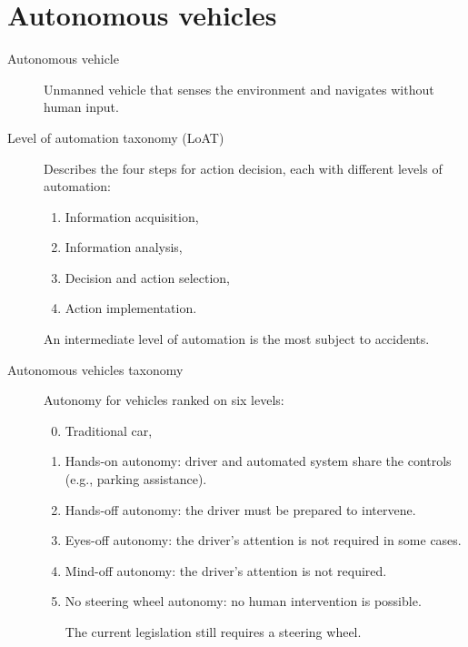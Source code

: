 \chapter{Autonomous vehicles}

\begin{description}
    \item[Autonomous vehicle] 
        Unmanned vehicle that senses the environment and navigates without human input.
\end{description}


\begin{description}
    \item[Level of automation taxonomy (LoAT)] 
        Describes the four steps for action decision, each with different levels of automation:
        \begin{enumerate}
            \item Information acquisition,
            \item Information analysis,
            \item Decision and action selection,
            \item Action implementation.
        \end{enumerate}

        \begin{remark}
            An intermediate level of automation is the most subject to accidents.
        \end{remark}
\end{description}


\begin{description}
    \item[Autonomous vehicles taxonomy] 
        Autonomy for vehicles ranked on six levels:
        \begin{enumerate}
            \setcounter{enumi}{-1}
            \item Traditional car,
            \item Hands-on autonomy: driver and automated system share the controls (e.g., parking assistance).
            \item Hands-off autonomy: the driver must be prepared to intervene.
            \item Eyes-off autonomy: the driver's attention is not required in some cases. 
            \item Mind-off autonomy: the driver's attention is not required. 
            \item No steering wheel autonomy: no human intervention is possible.
                \begin{remark}
                    The current legislation still requires a steering wheel.
                \end{remark}
        \end{enumerate}
\end{description}



